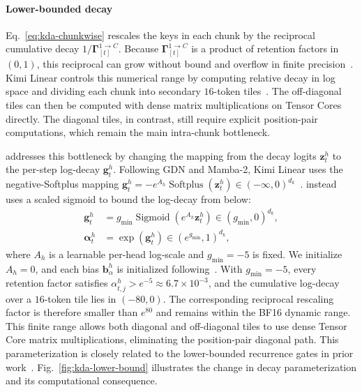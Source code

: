 \paragraph{Lower-bounded decay}
Eq.~\ref{eq:kda-chunkwise} rescales the keys in each chunk by the reciprocal cumulative decay $1/\bm{\Gamma}_{[t]}^{1\rightarrow C}$.
Because $\bm{\Gamma}_{[t]}^{1\rightarrow C}$ is a product of retention factors in $(0,1)$, this reciprocal can grow without bound and overflow in finite precision~\citep{yang-etal-2024-gla,team2025kimi}.
Kimi Linear controls this numerical range by computing relative decay in log space and dividing each chunk into secondary $16$-token tiles~\citep{yang-etal-2024-gla,team2025kimi}.
The off-diagonal tiles can then be computed with dense matrix multiplications on Tensor Cores directly.
The diagonal tiles, in contrast, still require explicit position-pair computations, which remain the main intra-chunk bottleneck.

 addresses this bottleneck by changing the mapping from the decay logits $\bm{z}_t^h$ to the per-step log-decay $\bm{g}_t^h$.
Following GDN and Mamba-2, Kimi Linear uses the negative-Softplus mapping $\bm{g}_t^h=-e^{A_h}\operatorname{Softplus}(\bm{z}_t^h)\in(-\infty,0)^{d_k}$~\citep{yang-2025-gdn,mamba2,team2025kimi}.
 instead uses a scaled sigmoid to bound the log-decay from below:
\begin{align}
    \bm{g}_t^h
     & = g_{\min}\operatorname{Sigmoid}\!\left(e^{A_h}\bm{z}_t^h\right)
    \in (g_{\min},0)^{d_k}, \nonumber                                   \\
    \bm{\alpha}_t^h
     & = \exp(\bm{g}_t^h)
    \in \left(e^{g_{\min}},1\right)^{d_k},
    \label{eq:kda-forget-gate}
\end{align}
where $A_h$ is a learnable per-head log-scale and $g_{\min}=-5$ is fixed.
We initialize $A_h=0$, and each bias $\bm{b}_{\alpha}^h$ is initialized following~\citep{team2025kimi,mamba2,yang-2025-gdn}.
With $g_{\min}=-5$, every retention factor satisfies $\alpha_{t,j}^h>e^{-5}\approx6.7\times10^{-3}$, and the cumulative log-decay over a $16$-token tile lies in $(-80,0)$.
The corresponding reciprocal rescaling factor is therefore smaller than $e^{80}$ and remains within the BF16 dynamic range.
This finite range allows both diagonal and off-diagonal tiles to use dense Tensor Core matrix multiplications, eliminating the position-pair diagonal path.
This parameterization is closely related to the lower-bounded recurrence gates in prior work~\citep{qin2024hgrn2,de2024griffin,peng-2025-rwkv7}.
Fig.~\ref{fig:kda-lower-bound} illustrates the change in decay parameterization and its computational consequence.

